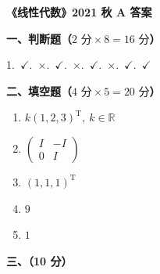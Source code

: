 \documentclass[a4paper,11pt]{ctexart}
\newcommand{\T}{\mathrm{T}}
\begin{document}
\begin{center}
  {\Large\bfseries 《线性代数》2021 秋 A 答案}
\end{center}

\vspace{0.6em}

\textbf{一、判断题（$2\text{ 分}\times 8 = 16\text{ 分}$）}

1.\ $\checkmark$.\ $\times$.\ $\checkmark$.\ $\times$.\ $\checkmark$.\ $\times$.\ $\checkmark$.\ $\checkmark$

\vspace{0.8em}

\textbf{二、填空题（$4\text{ 分}\times 5 = 20\text{ 分}$）}

\begin{enumerate}[label=\arabic*., leftmargin=2em, itemsep=0.35em, topsep=0.3em]
  \item $k(1, 2, 3)^{\T},\ k \in \mathbb{R}$
  \item $\begin{pmatrix} I & -I \\ 0 & I \end{pmatrix}$
  \item $(1, 1, 1)^{\T}$
  \item $9$
  \item $1$
\end{enumerate}

\vspace{0.8em}

\textbf{三、（10 分）}
\end{document}
